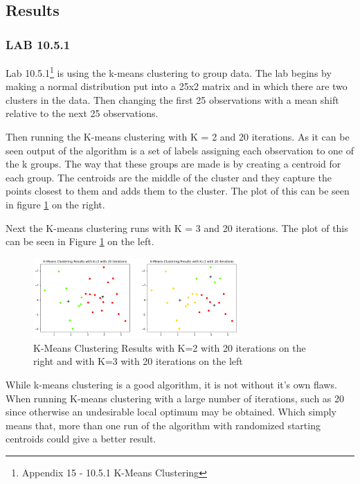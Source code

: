 \subsection{Results}
\subsubsection*{LAB 10.5.1}
Lab 10.5.1\footnote{Appendix 15 - 10.5.1 K-Means Clustering} is using the k-means clustering to group data. The lab begins by making a normal distribution put into a 25x2 matrix and in which there are two clusters in the data. Then changing the first 25 observations with a mean shift relative to the next 25 observations.

Then running the K-means clustering with K = 2 and 20 iterations. As it can be seen output of the algorithm is a set of labels assigning each observation to one of the k groups. The way that these groups are made is by creating a centroid for each group. The centroids are the middle of the cluster and they capture the points closest to them and adds them to the cluster. The plot of this can be seen in figure \ref{fig:kmeansclusteringk2_20Iteration} on the right.

Next the K-means clustering runs with K = 3 and 20 iterations. The plot of this can be seen in Figure \ref{fig:kmeansclusteringk2_20Iteration} on the left.

\begin{figure}[H]
	\centering
	\includegraphics[width=0.7\textwidth]{clusteringMethods/kmeansclustering/fig/k-mean.png}
	\caption{K-Means Clustering Results with K=2 with 20 iterations on the right and  with K=3 with 20 iterations on the left}
	\label{fig:kmeansclusteringk2_20Iteration}
\end{figure}

While k-means clustering is a good algorithm, it is not without it's own flaws. When running K-means clustering with a large number of iterations, such as 20 since otherwise an undesirable local optimum may be obtained. Which simply means that, more than one run of the algorithm with randomized starting centroids could give a better result.


